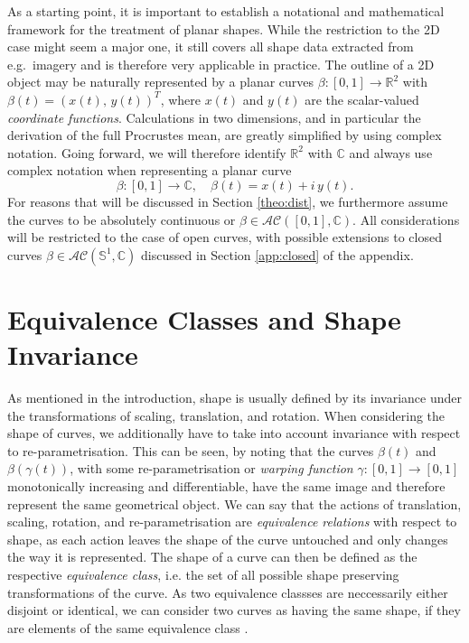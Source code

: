 As a starting point, it is important to establish a notational and mathematical framework for the treatment of planar shapes.
While the restriction to the 2D case might seem a major one, it still covers all shape data extracted from e.g.\ imagery and is therefore very applicable in practice.
The outline of a 2D object may be naturally represented by a planar curves $\beta : [0,1] \rightarrow \mathbb{R}^2$ with $\beta(t) = (x(t),\, y(t))^T$, where $x(t)$ and $y(t)$ are the scalar-valued \textit{coordinate functions}.
Calculations in two dimensions, and in particular the derivation of the full Procrustes mean, are greatly simplified by using complex notation.
Going forward, we will therefore identify $\mathbb{R}^2$ with $\mathbb{C}$ and always use complex notation when representing a planar curve
$$\beta : [0,1] \rightarrow \mathbb{C}, \quad \beta(t) = x(t) + i\, y(t).$$
For reasons that will be discussed in Section \ref{theo:dist}, we furthermore assume the curves to be absolutely continuous or $\beta \in \mathcal{AC}([0,1], \mathbb{C})$.
All considerations will be restricted to the case of open curves, with possible extensions to closed curves $\beta \in \mathcal{AC}(\mathbb{S}^1, \mathbb{C})$ discussed in Section \ref{app:closed} of the appendix.


\section{Equivalence Classes and Shape Invariance}
\label{theo:inv}
As mentioned in the introduction, shape is usually defined by its invariance under the transformations of scaling, translation, and rotation.
When considering the shape of curves, we additionally have to take into account invariance with respect to re-parametrisation.
This can be seen, by noting that the curves $\beta(t)$ and $\beta(\gamma(t))$, with some re-parametrisation or \textit{warping function} $\gamma : [0,1] \rightarrow [0,1]$ monotonically increasing and differentiable, have the same image and therefore represent the same geometrical object.
We can say that the actions of translation, scaling, rotation, and re-parametrisation are \textit{equivalence relations} with respect to shape, as each action leaves the shape of the curve untouched and only changes the way it is represented.
The shape of a curve can then be defined as the respective \textit{equivalence class}, i.e. the set of all possible shape preserving transformations of the curve.
As two equivalence classses are neccessarily either disjoint or identical, we can consider two curves as having the same shape, if they are elements of the same equivalence class \parencite[see][40]{SrivastavaKlassen2016}.

